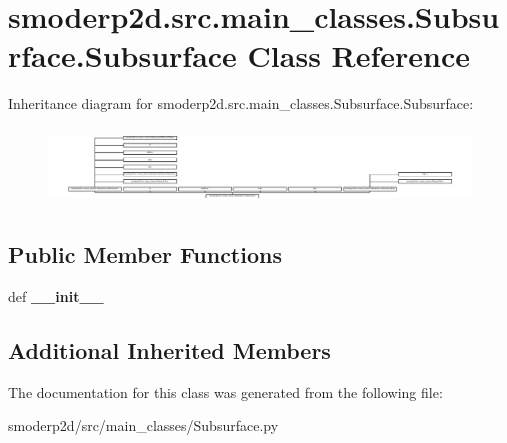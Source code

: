 \hypertarget{classsmoderp2d_1_1src_1_1main__classes_1_1Subsurface_1_1Subsurface}{\section{smoderp2d.\-src.\-main\-\_\-classes.\-Subsurface.\-Subsurface Class Reference}
\label{classsmoderp2d_1_1src_1_1main__classes_1_1Subsurface_1_1Subsurface}
}
Inheritance diagram for smoderp2d.\-src.\-main\-\_\-classes.\-Subsurface.\-Subsurface\-:\begin{figure}[H]
\begin{center}
\leavevmode
\includegraphics[height=2.068965cm]{classsmoderp2d_1_1src_1_1main__classes_1_1Subsurface_1_1Subsurface}
\end{center}
\end{figure}
\subsection*{Public Member Functions}
\begin{DoxyCompactItemize}
\item 
\hypertarget{classsmoderp2d_1_1src_1_1main__classes_1_1Subsurface_1_1Subsurface_a64abac9f92b883482bdeba247c6b5d44}{def {\bfseries \-\_\-\-\_\-init\-\_\-\-\_\-}}\label{classsmoderp2d_1_1src_1_1main__classes_1_1Subsurface_1_1Subsurface_a64abac9f92b883482bdeba247c6b5d44}

\end{DoxyCompactItemize}
\subsection*{Additional Inherited Members}


The documentation for this class was generated from the following file\-:\begin{DoxyCompactItemize}
\item 
smoderp2d/src/main\-\_\-classes/Subsurface.\-py\end{DoxyCompactItemize}
